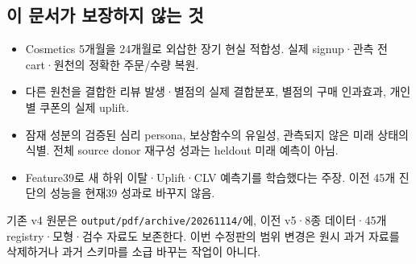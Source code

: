 \documentclass[11pt,a4paper]{article}
\newcommand{\code}[1]{{\ttfamily\footnotesize\nolinkurl{#1}}}
\newcommand{\page}{\clearpage}
\begin{document}
\subsection{이 문서가 보장하지 않는 것}
\begin{itemize}
\item Cosmetics 5개월을 24개월로 외삽한 장기 현실 적합성. 실제 signup·관측 전 cart·원천의 정확한 주문/수량 복원.
\item 다른 원천을 결합한 리뷰 발생·별점의 실제 결합분포, 별점의 구매 인과효과, 개인별 쿠폰의 실제 uplift.
\item 잠재 성분의 검증된 심리 persona, 보상함수의 유일성, 관측되지 않은 미래 상태의 식별. 전체 source donor 재구성 성과는 heldout 미래 예측이 아님.
\item Feature39로 새 하위 이탈·Uplift·CLV 예측기를 학습했다는 주장. 이전 45개 진단의 성능을 현재39 성과로 바꾸지 않음.
\end{itemize}

기존 v4 원문은 \code{output/pdf/archive/20261114/}에, 이전 v5·8종 데이터·45개 registry·모형·검수 자료도 보존한다. 이번 수정판의 범위 변경은 원시 과거 자료를 삭제하거나 과거 스키마를 소급 바꾸는 작업이 아니다.

\page
\end{document}
